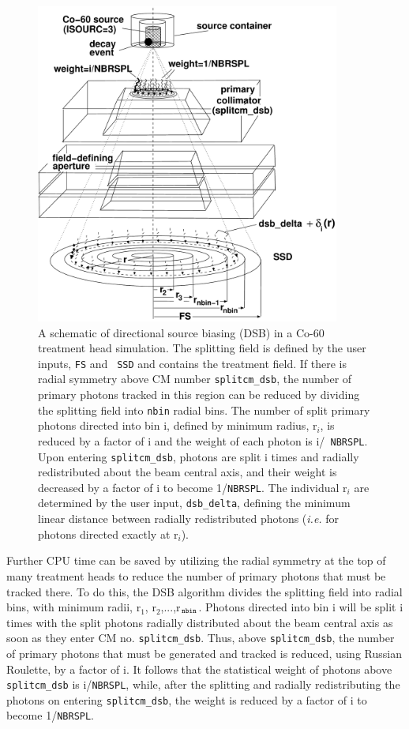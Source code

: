 \documentclass[12pt,twoside]{article}
\begin{document}
\begin{figure}[ht]
\begin{center}
\includegraphics[width=10cm]{figures/dsb}
\end{center}
\caption[Schematic of DSB]
{A schematic of directional source biasing (DSB) in a Co-60 treatment head
simulation. The splitting field is defined by the user inputs, {\tt FS} and {\tt
SSD} and contains the treatment field.  If there is radial symmetry above CM
number {\tt splitcm\_dsb}, the number of primary photons tracked in this region
can be reduced by dividing the splitting field into {\tt nbin} radial bins. The
number of split primary photons directed into bin i, defined by minimum radius,
r$_i$, is reduced by a factor of i and the weight of each photon is i/{\tt
NBRSPL}.  Upon entering {\tt splitcm\_dsb}, photons are split i times and
radially redistributed about the beam central axis, and their weight is
decreased by a factor of i to become 1/{\tt NBRSPL}. The individual r$_i$ are
determined by the user input, {\tt dsb\_delta}, defining the minimum linear
distance between radially redistributed photons ({\em i.e.} for photons directed
exactly at r$_i$).}
\label{dsb_fig}
\end{figure}

Further CPU time can be saved by utilizing the radial symmetry at the top of many treatment heads to reduce the
number of primary photons that must be tracked there.  To do this, the DSB algorithm divides the splitting field
into radial bins, with minimum radii, r$_1$, r$_2$,...,r$_{\tt nbin}$.
Photons directed into bin i will be split
i times with the split photons radially distributed about the beam central axis as soon as they enter
CM no. {\tt splitcm\_dsb}.  Thus, above {\tt splitcm\_dsb}, the number of primary photons that must be
generated and tracked is
reduced, using Russian Roulette, by a factor of i.  It follows that the statistical weight of photons above {\tt splitcm\_dsb} is i/{\tt NBRSPL}, while, after the splitting and radially redistributing the photons on entering {\tt splitcm\_dsb}, the weight is
reduced by a factor of i to become 1/{\tt NBRSPL}.
\end{document}
